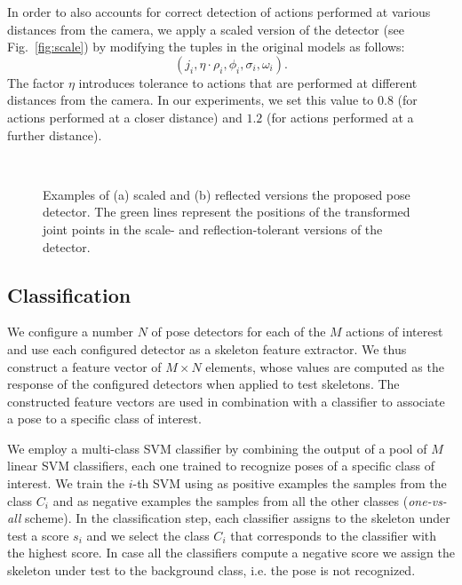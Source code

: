 \documentclass[runningheads,a4paper]{llncs}
\begin{document}
In order to also accounts for correct detection of actions performed at various distances from the camera, we apply a scaled version of the detector (see Fig.~\ref{fig:scale}) by modifying the tuples in the original models as follows:
\begin{equation}
(j_i, \eta \cdot \rho_i, \phi_i, \sigma_i, \omega_i).
\end{equation}
The factor $\eta$ introduces tolerance to actions that are performed at different distances from the camera. In our experiments, we set this value to $0.8$ (for actions performed at a closer distance) and $1.2$ (for actions performed at a further distance).

\begin{figure}[!t]
   \centering
       \setlength{\unitlength}{42mm}%
    ~
   \caption{Examples of (a) scaled and (b) reflected versions the proposed pose detector. The green lines represent the positions of the transformed joint points in the scale- and reflection-tolerant versions of the detector.}
   \label{fig:scale_reflection}
\end{figure}



\subsection{Classification}
We configure a number $N$ of pose detectors for each of the $M$ actions of interest and use each configured detector as a skeleton feature extractor. We thus construct a feature vector of $M\times N$ elements, whose values are computed as the response of the configured detectors when applied to test skeletons.
The constructed feature vectors are used in combination with a classifier to associate a pose to a specific class of interest.

We employ a multi-class SVM classifier by combining the output of a pool of $M$ linear SVM classifiers, each one trained to recognize poses of a specific class of interest.
We train the $i$-th SVM using as positive examples the samples from the class $C_i$ and as negative examples  the samples from all the other classes (\emph{one-vs-all} scheme).  
In the classification step, each classifier assigns to the skeleton under test a score $s_i$ and we select the class $C_i$ that corresponds to the classifier with the highest score. In case all the classifiers compute a negative score we assign the skeleton under test to the background class, i.e. the pose is not recognized.
\end{document}
